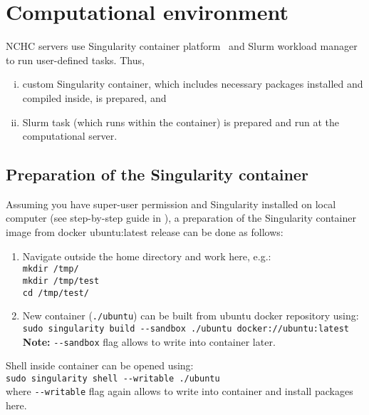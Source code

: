 \section{Computational environment}
\label{sec:env}

NCHC servers use Singularity container platform~\cite{singularity} and Slurm workload manager~\cite{slurm} to run user-defined tasks. Thus,  
\begin{enumerate}[(i)]
    \item custom Singularity container, which includes necessary packages installed and compiled inside, is prepared, and
    \item Slurm task (which runs within the container) is prepared and run at the computational server.
\end{enumerate}

\subsection{Preparation of the Singularity container}
\label{subsec:prepCont}

Assuming you have super-user permission and Singularity installed on local computer (see step-by-step guide in \cite{singularityInstall}), a preparation of the Singularity container image from docker ubuntu:latest release can be done as follows: 
\begin{enumerate}
    \item Navigate outside the home directory and work here, e.g.: \\[0.2cm] 
    \texttt{mkdir /tmp/} \\[0.2cm] 
    \texttt{mkdir /tmp/test} \\[0.2cm] 
    \texttt{cd /tmp/test/} 
    \item New container (\texttt{./ubuntu}) can be built from ubuntu docker repository using:\\[0.2cm] 
    \texttt{sudo singularity build -{}-sandbox ./ubuntu docker://ubuntu:latest}\\[0.2cm] 
    \textbf{Note:} \texttt{-{}-sandbox} flag allows to write into container later.
\end{enumerate}

Shell inside container can be opened using: \\[0.2cm]
\indent\quad\quad\texttt{sudo singularity shell -{}-writable ./ubuntu} \\[0.2cm]
where \texttt{-{}-writable} flag again allows to write into container and install packages here.

